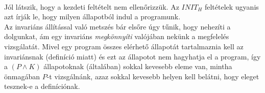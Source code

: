 \documentclass[12pt]{article}
\begin{document}
	\paragraph{}Jól látszik, hogy a kezdeti feltételt nem ellenőrizzük. Az $INIT_H$ feltételek ugyanis azt írják le, hogy milyen állapotból indul a programunk.\\
	
	Az invariáns állítással való metszés bár elsőre úgy tűnik, hogy nehezíti a dolgunkat, ám egy invariáns \textit{megkönnyíti} valójában nekünk a megfelelés vizsgálatát. Mivel egy program összes elérhető állapotát tartalmaznia kell az invariánsnak (definíció miatt) és ezt az állapotot nem hagyhatja el a program, így a $(P\land K)$ állapotoknak (általában) sokkal kevesebb eleme van, mintha önmagában $P$-t vizsgálnánk, azaz sokkal kevesebb helyen kell belátni, hogy eleget tesznek-e a definíciónak.
	
	
	
	
	
	
	
	\newpage
\end{document}
